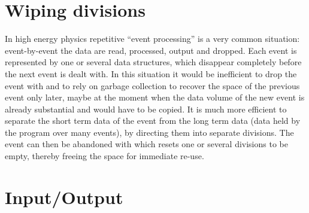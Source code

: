 \vspace*{-5mm}
\begin{Fighere}
\begin{center}
\mbox{}
\end{center}
\caption[The layout of memory in a division before and after garbage
         collection.]%
        {The layout of memory in a division before and after garbage
collection.\\ The top part of the picture
shows a number of ``live'' banks numbered 1 to 7
and 5' to 1', which interspersed ``dead''
banks (i.e. banks whose information is no longer needed and whose space
can hence be recovered).
The bottom part of the picture shows the same ``live''
banks which have been left justified to increase the free space.}
\label{RELOCAT}
\end{Fighere}

\newpage
{}
\section{Wiping divisions}

In high energy physics repetitive ``event processing''
is a very common
situation: event-by-event the data are read, processed, output and
dropped. Each event is represented by one or several data structures,
which disappear completely before the next event is dealt with.
In this situation it would be inefficient to drop the event with 
and to rely on garbage collection to recover the space of the previous
event only later, maybe at the moment when the data volume of the new
event is already substantial and would have to be copied. It is much
more efficient to separate the short term data of the event from the
long term data (data held by the program over many events), by
directing them into separate divisions. The event can then be
abandoned with  which resets one or several divisions to be empty,
thereby freeing the space for immediate re-use.

\section{Input/Output}

